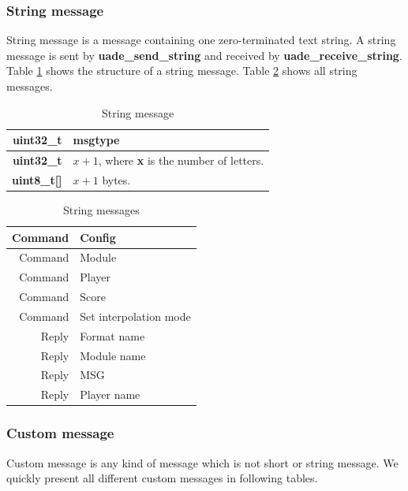 \documentclass{article}
\begin{document}
\subsubsection{String message}

String message is a message containing one zero-terminated text string.
A string message is sent by \textbf{uade\_send\_string} and received by
\textbf{uade\_receive\_string}. Table \ref{tab:string_message} shows
the structure of a string message. Table \ref{tab:string_messages} shows
all string messages.

\begin{table}
\begin{center}
\caption{String message}
\label{tab:string_message}
\begin{tabular}{|r|l|}
\hline
\textbf{uint32\_t} & msgtype\\
\hline
\textbf{uint32\_t} & $x + 1$, where \textbf{x} is the number of letters.\\
\hline
\textbf{uint8\_t[]} & $x + 1$ bytes.\\
\hline
\end{tabular}
\end{center}
\end{table}

\begin{table}
\begin{center}
\caption{String messages}
\label{tab:string_messages}
\begin{tabular}{|r|l|}
\hline
Command & Config\\
\hline
Command & Module\\
\hline
Command & Player\\
\hline
Command & Score\\
\hline
Command & Set interpolation mode\\
\hline
Reply & Format name\\
\hline
Reply & Module name\\
\hline
Reply & MSG\\
\hline
Reply & Player name\\
\hline
\end{tabular}
\end{center}
\end{table}

\subsubsection{Custom message}

Custom message is any kind of message which is not short or string message.
We quickly present all different custom messages in following tables.
\end{document}
